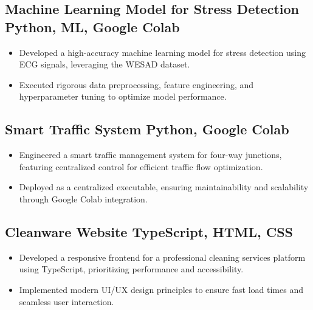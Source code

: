 \subsection{{Machine Learning Model for Stress Detection} \hfill Python, ML, Google Colab}
\begin{itemize}
\item Developed a high-accuracy machine learning model for stress detection using ECG signals, leveraging the WESAD dataset.
\item Executed rigorous data preprocessing, feature engineering, and hyperparameter tuning to optimize model performance.
\end{itemize}

\subsection{{Smart Traffic System} \hfill Python, Google Colab}
\begin{itemize}
\item Engineered a smart traffic management system for four-way junctions, featuring centralized control for efficient traffic flow optimization.
\item Deployed as a centralized executable, ensuring maintainability and scalability through Google Colab integration.
\end{itemize}

\subsection{{Cleanware Website} \hfill TypeScript, HTML, CSS}
\begin{itemize}
\item Developed a responsive frontend for a professional cleaning services platform using TypeScript, prioritizing performance and accessibility.
\item Implemented modern UI/UX design principles to ensure fast load times and seamless user interaction.
\end{itemize}
